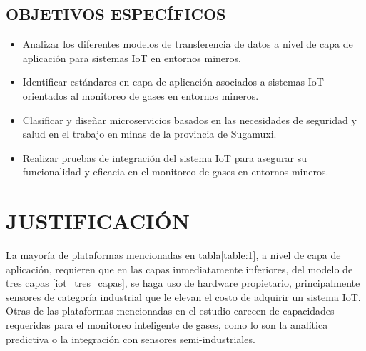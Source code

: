 \documentclass[stu,12pt,floatsintext]{apa7}
\begin{document}
	\subsection{OBJETIVOS ESPECÍFICOS}
	\begin{itemize}
		\item Analizar los diferentes modelos de transferencia de datos a nivel de capa de aplicación para sistemas IoT en entornos mineros.
		\item Identificar estándares en capa de aplicación asociados a sistemas IoT orientados al monitoreo de gases en entornos mineros.
		\item Clasificar y diseñar microservicios basados en las necesidades de seguridad y salud en el trabajo en minas de la provincia de Sugamuxi.
		\item Realizar pruebas de integración del sistema IoT para asegurar su funcionalidad y eficacia en el monitoreo de gases en entornos mineros.
	\end{itemize}
	\section{JUSTIFICACIÓN}
		
		La mayoría de plataformas mencionadas en tabla\ref{table:1}, a nivel de capa de aplicación, requieren que en las capas inmediatamente inferiores, del modelo de tres capas \ref{iot_tres_capas}, se haga uso de hardware propietario, principalmente sensores de categoría industrial que le elevan el costo de adquirir un sistema IoT. Otras de las plataformas mencionadas en el estudio carecen de capacidades requeridas para el monitoreo inteligente de gases, como lo son la analítica predictiva o la integración con sensores semi-industriales.
			
\end{document}
